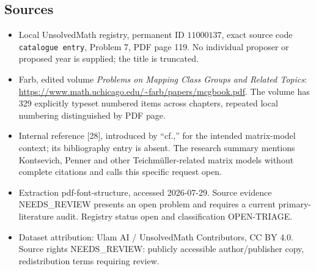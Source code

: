 \documentclass[11pt]{article}
\begin{document}
\subsection{Sources}
\begin{itemize}
\item Local UnsolvedMath registry, permanent ID \(11000137\), exact source code \texttt{catalogue entry}, Problem 7, PDF page 119. No individual proposer or proposed year is supplied; the title is truncated.
\item Farb, edited volume \emph{Problems on Mapping Class Groups and Related Topics}: \url{https://www.math.uchicago.edu/~farb/papers/mcgbook.pdf}. The volume has 329 explicitly typeset numbered items across chapters, repeated local numbering distinguished by PDF page.
\item Internal reference [28], introduced by ``cf.,'' for the intended matrix-model context; its bibliography entry is absent. The research summary mentions Kontsevich, Penner and other Teichmüller-related matrix models without complete citations and calls this specific request open.
\item Extraction pdf-font-structure, accessed 2026-07-29. Source evidence NEEDS\_REVIEW presents an open problem and requires a current primary-literature audit. Registry status open and classification OPEN-TRIAGE.
\item Dataset attribution: Ulam AI / UnsolvedMath Contributors, CC BY 4.0. Source rights NEEDS\_REVIEW: publicly accessible author/publisher copy, redistribution terms requiring review.
\end{itemize}
\end{document}
